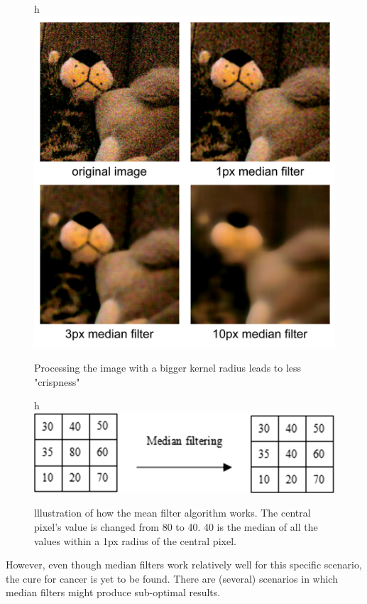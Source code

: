 \documentclass[twoside,a4paper,article]{combine}
\begin{document}
\begin{figure}{h}
    \centering
    \includegraphics[width=1\linewidth]{median_example.jpg}
    \caption{Processing the image with a bigger kernel radius leads to less "crispness"}
    \label{fig:enter-label}
\end{figure}
\begin{figure}{h}
    \centering
    \includegraphics[width=1\linewidth]{medianfiltering.PNG}
    \caption{lllustration of how the mean filter algorithm works. The central pixel's value is changed from 80 to 40. 40 is the median of all the values within a 1px radius of the central pixel.}
    \label{fig:enter-label}
\end{figure}
However, even though median filters work relatively well for this specific scenario, the cure for cancer is yet to be found. There are (several) scenarios in which median filters might produce sub-optimal results.
\end{document}
